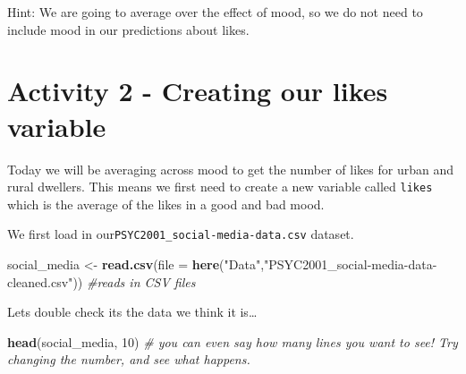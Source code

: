 \documentclass[
]{book}
\newenvironment{Shaded}{\begin{snugshade}}{\end{snugshade}}
\newcommand{\AttributeTok}[1]{\textcolor[rgb]{0.13,0.29,0.53}{#1}}
\newcommand{\CommentTok}[1]{\textcolor[rgb]{0.56,0.35,0.01}{\textit{#1}}}
\newcommand{\DecValTok}[1]{\textcolor[rgb]{0.00,0.00,0.81}{#1}}
\newcommand{\FunctionTok}[1]{\textcolor[rgb]{0.13,0.29,0.53}{\textbf{#1}}}
\newcommand{\NormalTok}[1]{#1}
\newcommand{\OtherTok}[1]{\textcolor[rgb]{0.56,0.35,0.01}{#1}}
\newcommand{\StringTok}[1]{\textcolor[rgb]{0.31,0.60,0.02}{#1}}
\begin{document}
Hint: We are going to average over the effect of mood, so we do not need to include mood in our predictions about likes.

\section{Activity 2 - Creating our likes variable}\label{activity-2---creating-our-likes-variable}

Today we will be averaging across mood to get the number of likes for urban and rural dwellers. This means we first need to create a new variable called \texttt{likes} which is the average of the likes in a good and bad mood.

We first load in our\texttt{PSYC2001\_social-media-data.csv} dataset.

\begin{Shaded}
\begin{Highlighting}[]
\NormalTok{social\_media }\OtherTok{\textless{}{-}} \FunctionTok{read.csv}\NormalTok{(}\AttributeTok{file =} \FunctionTok{here}\NormalTok{(}\StringTok{"Data"}\NormalTok{,}\StringTok{"PSYC2001\_social{-}media{-}data{-}cleaned.csv"}\NormalTok{)) }\CommentTok{\#reads in CSV files}
\end{Highlighting}
\end{Shaded}

Lets double check its the data we think it is\ldots{}

\begin{Shaded}
\begin{Highlighting}[]
\FunctionTok{head}\NormalTok{(social\_media, }\DecValTok{10}\NormalTok{) }\CommentTok{\# you can even say how many lines you want to see! Try changing the number, and see what happens.}
\end{Highlighting}
\end{Shaded}
\end{document}
